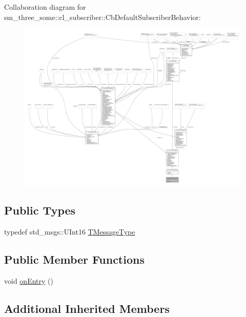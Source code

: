 Collaboration diagram for sm\+\_\+three\+\_\+some\+:\+:cl\+\_\+subscriber\+:\+:Cb\+Default\+Subscriber\+Behavior\+:
\nopagebreak
\begin{figure}[H]
\begin{center}
\leavevmode
\includegraphics[width=350pt]{classsm__three__some_1_1cl__subscriber_1_1CbDefaultSubscriberBehavior__coll__graph}
\end{center}
\end{figure}
\subsection*{Public Types}
\begin{DoxyCompactItemize}
\item 
typedef std\+\_\+msgs\+::\+U\+Int16 \hyperlink{classsm__three__some_1_1cl__subscriber_1_1CbDefaultSubscriberBehavior_a963e1040a9d7d8d49024b4d8f350895d}{T\+Message\+Type}
\end{DoxyCompactItemize}
\subsection*{Public Member Functions}
\begin{DoxyCompactItemize}
\item 
void \hyperlink{classsm__three__some_1_1cl__subscriber_1_1CbDefaultSubscriberBehavior_a9d1f8dfb490a26b1fcdab1b740436837}{on\+Entry} ()
\end{DoxyCompactItemize}
\subsection*{Additional Inherited Members}


